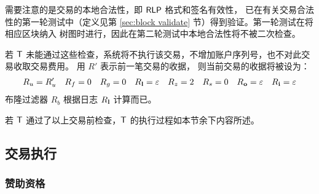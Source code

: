 需要注意的是交易的本地合法性，即 $\mathsf{RLP}$ 格式和签名有效性，
已在有关交易合法性的第一轮测试中（定义见第 \ref{sec:block validate} 节）得到验证。第一轮测试在将相应区块纳入 \name 树图时进行，因此在第二轮测试中本地合法性将不被二次检查。

若 $\textsf{T}$ 未能通过这些检查，系统将不执行该交易，不增加账户序列号，也不对此交易收取交易费用。
用 $R'$ 表示前一笔交易的收据，
则当前交易的收据将被设为：
\begin{align}
	R_u=R'_u && R_f=0 && R_g=0 && R_{\bf l}=\mathbb{\varepsilon} && R_z=2 && R_s=0 && R_{\bf o}=\mathbb{\varepsilon} && R_{\bf i}=\mathbb{\varepsilon}
\end{align}
%
布隆过滤器 $R_b$ 根据日志 $R_{\bf l}$ 计算而已。

若 $\textsf{T}$ 通过了以上交易前检查，$\textsf{T}$ 的执行过程如本节余下内容所述。

\subsection{交易执行}

\subsubsection{赞助资格}

